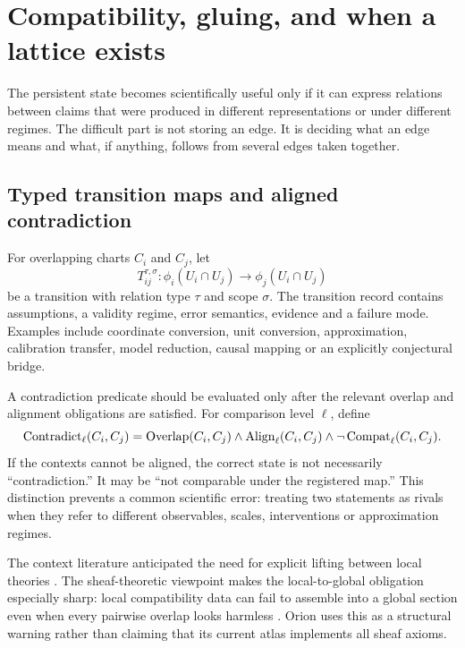 \section{Compatibility, gluing, and when a lattice exists}\label{sec:compatibility}

The persistent state becomes scientifically useful only if it can express relations between claims that were produced in different representations or under different regimes. The difficult part is not storing an edge. It is deciding what an edge means and what, if anything, follows from several edges taken together.

\subsection{Typed transition maps and aligned contradiction}

For overlapping charts \(C_i\) and \(C_j\), let
\[
T_{ij}^{\tau,\sigma}:\phi_i(U_i\cap U_j)\longrightarrow\phi_j(U_i\cap U_j)
\]
be a transition with relation type \(\tau\) and scope \(\sigma\). The transition record contains assumptions, a validity regime, error semantics, evidence and a failure mode. Examples include coordinate conversion, unit conversion, approximation, calibration transfer, model reduction, causal mapping or an explicitly conjectural bridge.

A contradiction predicate should be evaluated only after the relevant overlap and alignment obligations are satisfied. For comparison level \(\ell\), define
\[
\operatorname{Contradict}_{\ell}(C_i,C_j)=
\operatorname{Overlap}(C_i,C_j)\land
\operatorname{Align}_{\ell}(C_i,C_j)\land
\neg\operatorname{Compat}_{\ell}(C_i,C_j).
\]
If the contexts cannot be aligned, the correct state is not necessarily ``contradiction.'' It may be ``not comparable under the registered map.'' This distinction prevents a common scientific error: treating two statements as rivals when they refer to different observables, scales, interventions or approximation regimes.

The context literature anticipated the need for explicit lifting between local theories \cite{mccarthy1993,giunchiglia1993}. The sheaf-theoretic viewpoint makes the local-to-global obligation especially sharp: local compatibility data can fail to assemble into a global section even when every pairwise overlap looks harmless \cite{abramsky2011,curry2014,robinson2017}. Orion uses this as a structural warning rather than claiming that its current atlas implements all sheaf axioms.


